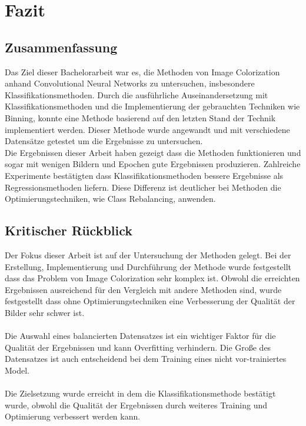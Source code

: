 \chapter{Fazit} 

\section{Zusammenfassung}
Das Ziel dieser Bachelorarbeit war es, die Methoden von Image Colorization anhand Convolutional Neural Networks zu untersuchen, insbesondere
Klassifikationsmethoden. Durch die ausführliche Auseinandersetzung mit Klassifikationsmethoden und die Implementierung der gebrauchten Techniken
wie Binning, konnte eine Methode basierend auf den letzten Stand der Technik implementiert werden. Dieser Methode wurde angewandt und mit verschiedene
Datensätze getestet um die Ergebnisse zu untersuchen.
\\
Die Ergebnissen dieser Arbeit haben gezeigt dass die Methoden funktionieren und sogar mit wenigen Bildern und Epochen gute Ergebnissen produzieren.
Zahlreiche Experimente bestätigten dass Klassifikationsmethoden bessere Ergebnisse als Regressionsmethoden liefern. Diese Differenz ist deutlicher
bei Methoden die Optimierungstechniken, wie Class Rebalancing, anwenden.


\section{Kritischer Rückblick}
Der Fokus dieser Arbeit ist auf der Untersuchung der Methoden gelegt. Bei der Erstellung, Implementierung und Durchführung der Methode wurde
festgestellt dass das Problem von Image Colorization sehr komplex ist. Obwohl die erreichten Ergebnissen ausreichend für den Vergleich mit 
andere Methoden sind, wurde festgestellt dass ohne Optimierungstechniken eine Verbesserung der Qualität der Bilder sehr schwer ist.
\\
\\
Die Auswahl eines balancierten Datensatzes ist ein wichtiger Faktor für die Qualität der Ergebnissen und kann Overfitting verhindern. Die Große 
des Datensatzes ist auch entscheidend bei dem Training eines nicht vor-trainiertes Model.
\\
\\
Die Zielsetzung wurde erreicht in dem die Klassifikationsmethode bestätigt wurde, obwohl die Qualität der Ergebnissen durch weiteres Training
und Optimierung verbessert werden kann.

